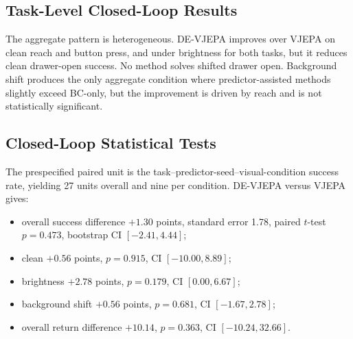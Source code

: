 \documentclass[10pt,twocolumn]{article}
\theoremstyle{tightstyle}
\begin{document}
\subsection{Task-Level Closed-Loop Results}

\begin{table}[t]
\centering
\caption{Task-level closed-loop success rates (\%). Each cell contains 60
episodes: 20 episodes for each of three predictor seeds.}
\label{tab:closed-loop-task-results}
\small
{}
\end{table}

The aggregate pattern is heterogeneous. DE-VJEPA improves over VJEPA on clean
reach and button press, and under brightness for both tasks, but it reduces
clean drawer-open success. No method solves shifted drawer open. Background
shift produces the only aggregate condition where predictor-assisted methods
slightly exceed BC-only, but the improvement is driven by reach and is not
statistically significant.

\subsection{Closed-Loop Statistical Tests}

The prespecified paired unit is the task--predictor-seed--visual-condition
success rate, yielding 27 units overall and nine per condition. DE-VJEPA versus
VJEPA gives:
\begin{itemize}[leftmargin=1.5em,itemsep=1pt]
  \item overall success difference $+1.30$ points, standard error 1.78,
  paired $t$-test $p=0.473$, bootstrap CI $[-2.41,4.44]$;
  \item clean $+0.56$ points, $p=0.915$, CI $[-10.00,8.89]$;
  \item brightness $+2.78$ points, $p=0.179$, CI $[0.00,6.67]$;
  \item background shift $+0.56$ points, $p=0.681$,
  CI $[-1.67,2.78]$;
  \item overall return difference $+10.14$, $p=0.363$,
  CI $[-10.24,32.66]$.
\end{itemize}
\end{document}
